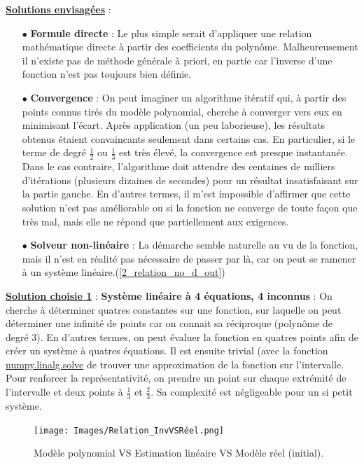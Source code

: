 \documentclass[12pt]{article}
\begin{document}
    \noindent\textbf{\underline{Solutions envisagées}} :
    \begin{enumerate}
        \item[$\bullet$] \textbf{Formule directe} : Le plus simple serait d'appliquer une relation mathématique directe à partir des coefficients du polynôme. Malheureusement il n'existe pas de méthode générale à priori, en partie car l'inverse d'une fonction n'est pas toujours bien définie.
        \item[$\bullet$] \textbf{Convergence} : On peut imaginer un algorithme itératif qui, à partir des points connus tirés du modèle polynomial, cherche à converger vers eux en minimisant l'écart. Après application (un peu laborieuse), les résultats obtenus étaient convaincants seulement dans certains cas. En particulier, si le terme de degré $\frac{1}{2}$ ou $\frac{1}{3}$ est très élevé, la convergence est presque instantanée. Dans le cas contraire, l'algorithme doit attendre des centaines de milliers d'itérations (plusieurs dizaines de secondes) pour un résultat insatisfaisant sur la partie gauche. En d'autres termes, il m'est impossible d'affirmer que cette solution n'est pas améliorable ou si la fonction ne converge de toute façon que très mal, mais elle ne répond que partiellement aux exigences.
        \item[$\bullet$] \textbf{Solveur non-linéaire} : La démarche semble naturelle au vu de la fonction, mais il n'est en réalité pas nécessaire de passer par là, car on peut se ramener à un système linéaire.(\ref{2_relation_no_d_out})
    \end{enumerate}
    \textbf{\underline{Solution choisie 1}} : \textbf{Système linéaire à 4 équations, 4 inconnus} : On cherche à déterminer quatres constantes sur une fonction, sur laquelle on peut déterminer une infinité de points car on connait sa réciproque (polynôme de degré 3).
    En d'autres termes, on peut évaluer la fonction en quatres points afin de créer un système à quatres équations. Il est ensuite trivial (avec la fonction \href{https://numpy.org/doc/2.2/reference/generated/numpy.linalg.solve.html}{numpy.linalg.solve} de trouver une approximation de la fonction sur l'intervalle. Pour renforcer la représentativité, on prendre un point sur chaque extrémité de l'intervalle et deux points à $\frac{1}{3}$ et $\frac{2}{3}$. Sa complexité est négligeable pour un si petit système.

    \begin{figure}[ht!]
        \centering
        \texttt{[image: Images/Relation\_InvVSRéel.png]}  
        \caption{Modèle polynomial VS Estimation linéaire VS Modèle réel (initial).}
    \end{figure}
\end{document}
